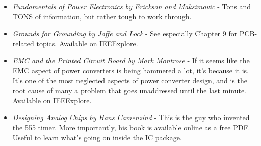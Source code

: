 \begin{itemize}

\item \emph{Fundamentals of Power Electronics by Erickson and Maksimovic} - Tons and TONS of information, but rather tough to work through.

\item \emph{Grounds for Grounding by Joffe and Lock} - See especially Chapter 9 for PCB-related topics. Available on IEEExplore.

\item \emph{EMC and the Printed Circuit Board by Mark Montrose} - If it seems like the EMC aspect of power converters is being hammered a lot, it's because it is. It's one of the most neglected aspects of power converter design, and is the root cause of many a problem that goes unaddressed until the last minute. Available on IEEExplore.

\item \emph{Designing Analog Chips by Hans Camenzind} - This is the guy who invented the 555 timer. More importantly, his book is available online as a free PDF. Useful to learn what's going on inside the IC package.

\end{itemize}
